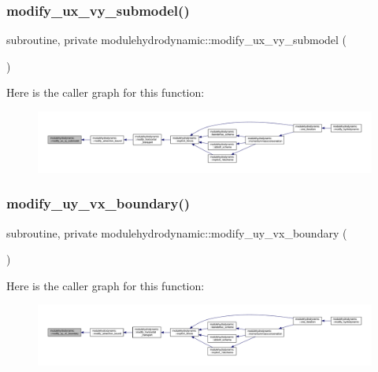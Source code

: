\subsubsection{\texorpdfstring{modify\+\_\+ux\+\_\+vy\+\_\+submodel()}{modify\_ux\_vy\_submodel()}}
{\footnotesize\ttfamily subroutine, private modulehydrodynamic\+::modify\+\_\+ux\+\_\+vy\+\_\+submodel (\begin{DoxyParamCaption}{ }\end{DoxyParamCaption})\hspace{0.3cm}{\ttfamily [private]}}

Here is the caller graph for this function\+:\nopagebreak
\begin{figure}[H]
\begin{center}
\leavevmode
\includegraphics[width=350pt]{namespacemodulehydrodynamic_a6396fb9a63198209bc95000bda6ab5fc_icgraph}
\end{center}
\end{figure}
\mbox{\label{namespacemodulehydrodynamic_a39fedec790eef204c11688a4105fcfc1}} 
\subsubsection{\texorpdfstring{modify\+\_\+uy\+\_\+vx\+\_\+boundary()}{modify\_uy\_vx\_boundary()}}
{\footnotesize\ttfamily subroutine, private modulehydrodynamic\+::modify\+\_\+uy\+\_\+vx\+\_\+boundary (\begin{DoxyParamCaption}{ }\end{DoxyParamCaption})\hspace{0.3cm}{\ttfamily [private]}}

Here is the caller graph for this function\+:\nopagebreak
\begin{figure}[H]
\begin{center}
\leavevmode
\includegraphics[width=350pt]{namespacemodulehydrodynamic_a39fedec790eef204c11688a4105fcfc1_icgraph}
\end{center}
\end{figure}
\mbox{\label{namespacemodulehydrodynamic_afcaf5434809b23ffd61b09505bfda4f4}} 
